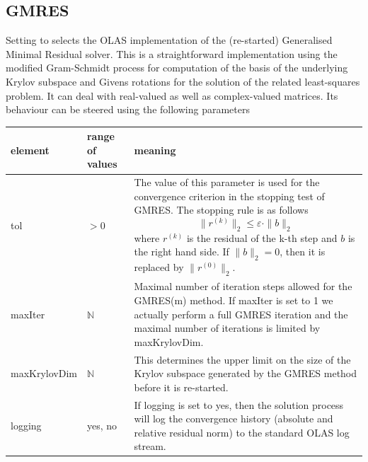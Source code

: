 \subsection{GMRES}
\label{sec:gmres}
%
%
Setting  to  selects the OLAS implementation of the
(re-started) Generalised Minimal Residual solver. This is a straightforward
implementation using the modified Gram-Schmidt process for computation of the
basis of the underlying Krylov subspace and Givens rotations for the solution
of the related least-squares problem. It can deal with real-valued as well as
complex-valued matrices. Its behaviour can be steered using the following
parameters
%
%
\begin{center}
\begin{tabular}{llp{}}
\toprule
element & range of values & meaning \\
\midrule
tol & $> 0$ & The value of this parameter is used for the convergence criterion
              in the stopping test of GMRES. The stopping rule is as follows
	\begin{displaymath}
        \|r^{(k)}\|_2  \leq \varepsilon \cdot \|b\|_2
	\end{displaymath}
        where $r^{(k)}$ is the residual of the k-th step and $b$ is the right
        hand side. If $\|b\|_2=0$, then it is replaced by $\|r^{(0)}\|_2$.\\
\midrule
maxIter & $\mathbb{N}$ & Maximal number of iteration steps allowed for the
                         GMRES(m) method. If maxIter is set to 1 we actually
	                 perform a full GMRES iteration and the maximal
	                 number of iterations is limited by maxKrylovDim.\\
\midrule
maxKrylovDim & $\mathbb{N}$ & This determines the upper limit on the size of
	                      the Krylov subspace generated by the GMRES method
                              before it is re-started.\\
\midrule
logging & yes, no & If logging is set to yes, then the solution process will
	            log the convergence history (absolute and relative residual
                    norm) to the standard OLAS log stream.\\
\bottomrule
\end{tabular}
\end{center}
%
%
%
